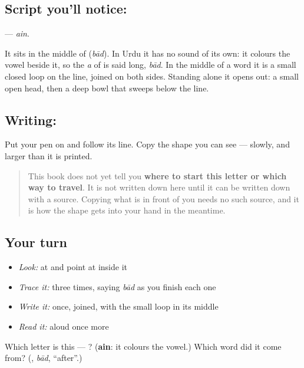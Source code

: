 \subsection*{Script you'll notice: }
\textbf{} — \emph{ain}.

It sits in the middle of \textbf{} (\emph{bād}). In Urdu it has no sound of its own: it colours the vowel beside it, so the \emph{a} of \textbf{} is said long, \emph{bād}. In the middle of a word it is a small closed loop on the line, joined on both sides. Standing alone it opens out: a small open head, then a deep bowl that sweeps below the line.

\subsection*{Writing: }
Put your pen on  and follow its line. Copy the shape you can see — slowly, and larger than it is printed.

\begin{quote}
This book does not yet tell you \textbf{where to start this letter or which way to travel}. It is not written down here until it can be written down with a source. Copying what is in front of you needs no such source, and it is how the shape gets into your hand in the meantime.
\end{quote}

\subsection*{Your turn}
\begin{itemize}
\raggedright
  \item \emph{Look:} at \textbf{} and point at  inside it
  \item \emph{Trace it:}  three times, saying \emph{bād} as you finish each one
  \item \emph{Write it:} \textbf{} once, joined, with the small loop in its middle
  \item \emph{Read it:} \textbf{} aloud once more
\end{itemize}

\begin{tcolorbox}[breakable,colback=teal!4,colframe=teal!35!black,title={Before you move on}]
Which letter is this — ? (\textbf{ain}: it colours the vowel.) Which word did it come from? (\textbf{}, \emph{bād}, \textquotedblleft{}after\textquotedblright{}.)
\end{tcolorbox}
